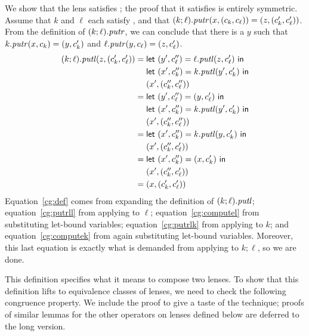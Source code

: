 \begin{defn}[$R$-similarity]
\begin{theorem}
\iffull
\begin{goodlens}
We show that the lens satisfies ; the proof that it satisfies
 is entirely symmetric. Assume that $k$ and $\ell$ each satisfy
, and that $(k;\ell).\mathit{putr}(x,(c_k,c_\ell))=(z,(c_k',c_\ell'))$.
From the definition of $(k;\ell).\mathit{putr}$, we can conclude that there is a $y$
such that $k.\mathit{putr}(x,c_k)=(y,c_k')$ and $\ell.\mathit{putr}(y,c_\ell)=(z,c_\ell')$.
\begin{align}
    (k;\ell).\putl(z,(c_k',c_\ell')) ={}
    & \mllet (y', c_\ell'') = \ell.\putl(z, c_\ell') \mline \label{cg:def}\\
    & \mllet (x', c_k'') = k.\putl(y', c_k') \mline \nonumber\\
    & (x', (c_k'', c_\ell'')) \nonumber\\
    ={}
    & \mllet (y', c_\ell'') = (y, c_\ell') \mline \label{cg:putrll}\\
    & \mllet (x', c_k'') = k.\putl(y', c_k') \mline \nonumber\\
    & (x', (c_k'', c_\ell'')) \nonumber\\
    ={}
    & \mllet (x', c_k'') = k.\putl(y, c_k') \mline \label{cg:computel}\\
    & (x', (c_k'', c_\ell')) \nonumber\\
    ={}
    & \mllet (x', c_k'') = (x, c_k') \mline \label{cg:putrlk}\\
    & (x', (c_k'', c_\ell')) \nonumber\\
    ={}
    & (x, (c_k', c_\ell')) \label{cg:computek}
\end{align}
Equation~\ref{cg:def} comes from expanding the definition of
$(k;\ell).\mathit{putl}$; equation~\ref{cg:putrll} from applying  to
$\ell$; equation~\ref{cg:computel} from substituting let-bound variables;
equation~\ref{cg:putrlk} from applying  to $k$; and
equation~\ref{cg:computek} from again substituting let-bound variables.
Moreover, this last equation is exactly what is demanded from applying
 to $k;\ell$, so we are done.
\end{goodlens}
\fi

This definition specifies what it means to compose two  lenses.
To show that this definition lifts to equivalence classes of lenses, we
need to check the following congruence property. \iffull\else We 
include the proof to give a taste of the technique; 
proofs of similar lemmas for the other operators on lenses 
defined below are deferred to the long version.\fi


\end{theorem}
\end{defn}
